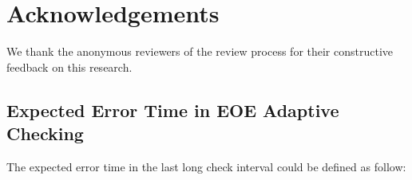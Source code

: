 \documentclass{sig-alternate}
\begin{document}
\section*{Acknowledgements}
We thank the anonymous reviewers of the review process for their constructive feedback on this research.





%
%
%
%
%





\appendix

  \subsection{Expected Error Time in EOE Adaptive Checking}
  \label{appendix}
The expected error time in the last long check interval could be defined as follow: 
\end{document}
